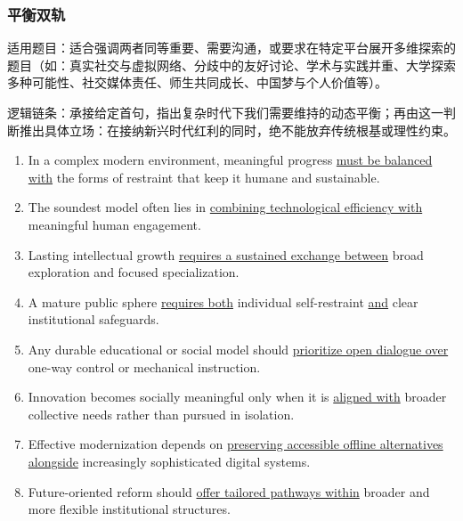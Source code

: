 

\subsubsection{平衡双轨}



适用题目：适合强调两者同等重要、需要沟通，或要求在特定平台展开多维探索的题目（如：真实社交与虚拟网络、分歧中的友好讨论、学术与实践并重、大学探索多种可能性、社交媒体责任、师生共同成长、中国梦与个人价值等）。



逻辑链条：承接给定首句，指出复杂时代下我们需要维持的动态平衡；再由这一判断推出具体立场：在接纳新兴时代红利的同时，绝不能放弃传统根基或理性约束。



\begin{enumerate}

    \item In a complex modern environment, meaningful progress \underline{must be balanced with} the forms of restraint that keep it humane and sustainable.

    \item The soundest model often lies in \underline{combining technological efficiency with} meaningful human engagement.

    \item Lasting intellectual growth \underline{requires a sustained exchange between} broad exploration and focused specialization.

    \item A mature public sphere \underline{requires both} individual self-restraint \underline{and} clear institutional safeguards.

    \item Any durable educational or social model should \underline{prioritize open dialogue over} one-way control or mechanical instruction.

    \item Innovation becomes socially meaningful only when it is \underline{aligned with} broader collective needs rather than pursued in isolation.

    \item Effective modernization depends on \underline{preserving accessible offline alternatives alongside} increasingly sophisticated digital systems.

    \item Future-oriented reform should \underline{offer tailored pathways within} broader and more flexible institutional structures.


\end{enumerate}
